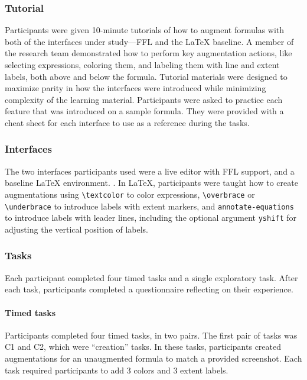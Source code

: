 \subsubsection{Tutorial}
Participants were given 10-minute tutorials of how to augment formulas with both of the interfaces under study---FFL and the LaTeX baseline. A member of the research team demonstrated how to perform key augmentation actions, like selecting expressions, coloring them, and labeling them with line and extent labels, both above and below the formula. Tutorial materials were designed to maximize parity in how the interfaces were introduced while minimizing complexity of the learning material. Participants were asked to practice each feature that was introduced on a sample formula. They were provided with a cheat sheet for each interface to use as a reference during the tasks.

\subsubsection{Interfaces}
The two interfaces participants used were a live editor with FFL support, and a baseline LaTeX environment. . In LaTeX, participants were taught how to create augmentations using \texttt{\textbackslash textcolor} to color expressions, \texttt{\textbackslash overbrace} or \texttt{\textbackslash underbrace} to introduce labels with extent markers, and \texttt{annotate-equations}~\cite{tool:annotateequations} to introduce labels with leader lines, including the optional argument \texttt{yshift} for adjusting the vertical position of labels.

\subsubsection{Tasks}
Each participant completed four timed tasks and a single exploratory task. After each task, participants completed a questionnaire reflecting on their experience.

\paragraph{Timed tasks}
Participants completed four timed tasks, in two pairs. The first pair of tasks was C1 and C2, which were ``creation'' tasks. In these tasks, participants created augmentations for an unaugmented formula to match a provided screenshot. Each task required participants to add 3 colors and 3 extent labels. 

